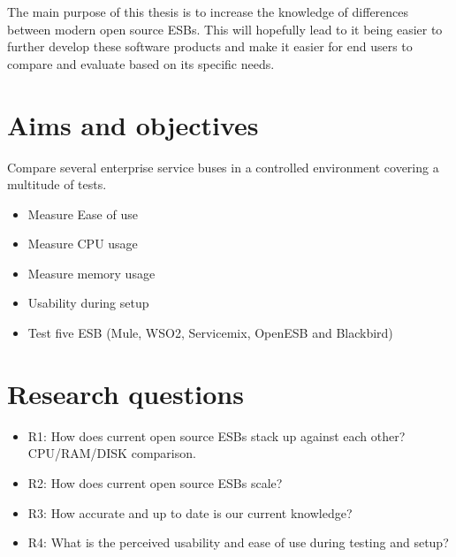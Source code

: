 \documentclass[10pt,a4paper]{proposal}
\begin{document}
The main purpose of this thesis is to increase the knowledge of differences between modern open source ESBs. 
This will hopefully lead to it being easier to further develop these software products and make it easier for end users to compare and evaluate based on its specific needs.


\section*{Aims and objectives}
Compare several enterprise service buses in a controlled environment covering a multitude of tests.

\begin{itemize}
	\item Measure Ease of use
	\item Measure CPU usage
	\item Measure memory usage
	\item Usability during setup
	\item  Test five ESB (Mule, WSO2, Servicemix, OpenESB and Blackbird)
\end{itemize}


\section*{Research questions}
\begin{itemize}
	\item R1: How does current open source ESBs stack up against each other? CPU/RAM/DISK comparison.
	\item R2: How does current open source ESBs scale?
	\item R3: How accurate and up to date is our current knowledge? 
	\item R4: What is the perceived usability and ease of use during testing and setup?
\end{itemize}
\end{document}

